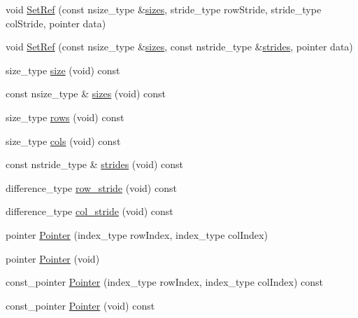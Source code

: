 \begin{DoxyCompactItemize}
void \hyperlink{classvct_dynamic_matrix_ref_owner_aa28b49c8ffd42d6709b2bdaa3122599e}{Set\-Ref} (const nsize\-\_\-type \&\hyperlink{classvct_dynamic_matrix_ref_owner_a24eabc5446686143d16cd34d777afe14}{sizes}, stride\-\_\-type row\-Stride, stride\-\_\-type col\-Stride, pointer data)
\item 
void \hyperlink{classvct_dynamic_matrix_ref_owner_a9272e259adb0b55606814cf6e43f05d5}{Set\-Ref} (const nsize\-\_\-type \&\hyperlink{classvct_dynamic_matrix_ref_owner_a24eabc5446686143d16cd34d777afe14}{sizes}, const nstride\-\_\-type \&\hyperlink{classvct_dynamic_matrix_ref_owner_a037820c6a435d70f7d9e98e372fc55a1}{strides}, pointer data)
\item 
size\-\_\-type \hyperlink{classvct_dynamic_matrix_ref_owner_a91c8c84c9dbee0d4a9aed5a05fe45b88}{size} (void) const 
\item 
const nsize\-\_\-type \& \hyperlink{classvct_dynamic_matrix_ref_owner_a24eabc5446686143d16cd34d777afe14}{sizes} (void) const 
\item 
size\-\_\-type \hyperlink{classvct_dynamic_matrix_ref_owner_a71161877fb7c5ee68659182330398d0c}{rows} (void) const 
\item 
size\-\_\-type \hyperlink{classvct_dynamic_matrix_ref_owner_a99f7f47110e3cfbef58a7274f5a4a9d8}{cols} (void) const 
\item 
const nstride\-\_\-type \& \hyperlink{classvct_dynamic_matrix_ref_owner_a037820c6a435d70f7d9e98e372fc55a1}{strides} (void) const 
\item 
difference\-\_\-type \hyperlink{classvct_dynamic_matrix_ref_owner_a3238908c752cac7ad6fab5ffca0d27a6}{row\-\_\-stride} (void) const 
\item 
difference\-\_\-type \hyperlink{classvct_dynamic_matrix_ref_owner_af7cdd61eca90ea52e9d980f58e526924}{col\-\_\-stride} (void) const 
\item 
pointer \hyperlink{classvct_dynamic_matrix_ref_owner_aea60969841afdaa9053383ff009f8ae4}{Pointer} (index\-\_\-type row\-Index, index\-\_\-type col\-Index)
\item 
pointer \hyperlink{classvct_dynamic_matrix_ref_owner_af5e4e2355486210dcd7c23a1cfb6b8f4}{Pointer} (void)
\item 
const\-\_\-pointer \hyperlink{classvct_dynamic_matrix_ref_owner_a94b95f1081e3f8645b65de3fab7e5ea4}{Pointer} (index\-\_\-type row\-Index, index\-\_\-type col\-Index) const 
\item 
const\-\_\-pointer \hyperlink{classvct_dynamic_matrix_ref_owner_a4ffee8b24d84e0f827d0372ea147dfef}{Pointer} (void) const 

\end{DoxyCompactItemize}
